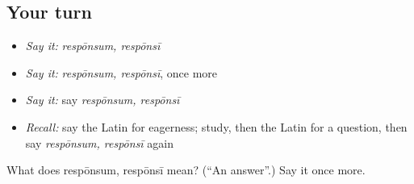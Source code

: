 \subsection*{Your turn}
\begin{itemize}
\raggedright
  \item \emph{Say it:} \emph{respōnsum, respōnsī}
  \item \emph{Say it:} \emph{respōnsum, respōnsī}, once more
  \item \emph{Say it:} say \emph{respōnsum, respōnsī}
  \item \emph{Recall:} say the Latin for eagerness; study, then the Latin for a question, then say \emph{respōnsum, respōnsī} again
\end{itemize}

\begin{tcolorbox}[breakable,colback=teal!4,colframe=teal!35!black,title={Before you move on}]
What does respōnsum, respōnsī mean? (\textquotedblleft{}An answer\textquotedblright{}.) Say it once more.
\end{tcolorbox}
